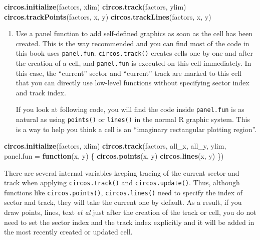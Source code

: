 \documentclass[]{book}
\newenvironment{Shaded}{\begin{snugshade}}{\end{snugshade}}
\newcommand{\KeywordTok}[1]{\textcolor[rgb]{0.13,0.29,0.53}{\textbf{#1}}}
\newcommand{\DataTypeTok}[1]{\textcolor[rgb]{0.13,0.29,0.53}{#1}}
\newcommand{\ControlFlowTok}[1]{\textcolor[rgb]{0.13,0.29,0.53}{\textbf{#1}}}
\newcommand{\NormalTok}[1]{#1}
\theoremstyle{definition}
\theoremstyle{definition}
\theoremstyle{remark}
\begin{document}
\begin{Shaded}
\begin{Highlighting}[]
\KeywordTok{circos.initialize}\NormalTok{(factors, xlim)}
\KeywordTok{circos.track}\NormalTok{(factors, ylim)}
\KeywordTok{circos.trackPoints}\NormalTok{(factors, x, y)}
\KeywordTok{circos.trackLines}\NormalTok{(factors, x, y)}
\end{Highlighting}
\end{Shaded}

\begin{enumerate}
\def\labelenumi{\arabic{enumi}.}
\setcounter{enumi}{2}
\item
  Use a panel function to add self-defined graphics as soon as the cell
  has been created. This is the way recommended and you can find most of
  the code in this book uses \texttt{panel.fun}. \texttt{circos.track()}
  creates cells one by one and after the creation of a cell, and
  \texttt{panel.fun} is executed on this cell immediately. In this case,
  the ``current'' sector and ``current'' track are marked to this cell
  that you can directly use low-level functions without specifying
  sector index and track index.

  If you look at following code, you will find the code inside
  \texttt{panel.fun} is as natural as using \texttt{points()} or
  \texttt{lines()} in the normal R graphic system. This is a way to help
  you think a cell is an ``imaginary rectangular plotting region''.
\end{enumerate}

\begin{Shaded}
\begin{Highlighting}[]
\KeywordTok{circos.initialize}\NormalTok{(factors, xlim)}
\KeywordTok{circos.track}\NormalTok{(factors, all_x, all_y, ylim,}
    \DataTypeTok{panel.fun =} \ControlFlowTok{function}\NormalTok{(x, y) \{}
        \KeywordTok{circos.points}\NormalTok{(x, y)}
        \KeywordTok{circos.lines}\NormalTok{(x, y)}
\NormalTok{\})}
\end{Highlighting}
\end{Shaded}

There are several internal variables keeping tracing of the current
sector and track when applying \texttt{circos.track()} and
\texttt{circos.update()}. Thus, although functions like
\texttt{circos.points()}, \texttt{circos.lines()} need to specify the
index of sector and track, they will take the current one by default. As
a result, if you draw points, lines, text \emph{et al} just after the
creation of the track or cell, you do not need to set the sector index
and the track index explicitly and it will be added in the most recently
created or updated cell.
\end{document}
